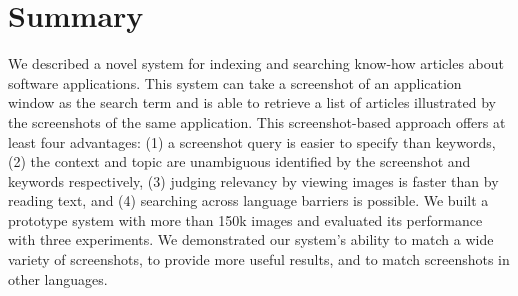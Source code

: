 \documentclass{www2010-submission}
\begin{document}
\vspace{0.2in}
\section{Summary}

We described a novel system for indexing and searching know-how
articles about software applications. This system can take a
screenshot of an application window as the search term and is able to
retrieve a list of articles illustrated by the screenshots of the same
application. This screenshot-based approach offers at least four
advantages: (1) a screenshot query is easier to specify than keywords,
(2) the context and topic are unambiguous identified by the screenshot
and keywords respectively, (3) judging relevancy by viewing images is
faster than by reading text, and (4) searching across language
barriers is possible. We built a prototype system with more than 150k
images and evaluated its performance with three experiments. We
demonstrated our system's ability to match a wide variety of
screenshots, to provide more useful results, and to match screenshots
in other languages.





\balancecolumns %

\end{document}
